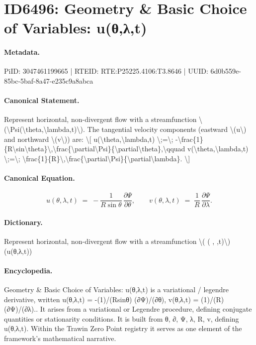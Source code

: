 \section*{ID6496: Geometry \& Basic Choice of Variables: u(θ,λ,t)}
\paragraph{Metadata.}
PiID: 3047461199665 | RTEID: RTE:P25225.4106:T3.8646 | UUID: 6d0b559e-85bc-5baf-8a47-e235c9a8abca

\paragraph{Canonical Statement.}
Represent horizontal, non-divergent flow with a streamfunction \textbackslash{}(\textbackslash{}Psi(\textbackslash{}theta,\textbackslash{}lambda,t)\textbackslash{}). The tangential velocity components (eastward \textbackslash{}(u\textbackslash{}) and northward \textbackslash{}(v\textbackslash{})) are: \textbackslash{}[ u(\textbackslash{}theta,\textbackslash{}lambda,t) \textbackslash{};=\textbackslash{}; -\textbackslash{}frac\{1\}\{R\textbackslash{}sin\textbackslash{}theta\}\textbackslash{},\textbackslash{}frac\{\textbackslash{}partial\textbackslash{}Psi\}\{\textbackslash{}partial\textbackslash{}theta\},\textbackslash{}qquad v(\textbackslash{}theta,\textbackslash{}lambda,t) \textbackslash{};=\textbackslash{}; \textbackslash{}frac\{1\}\{R\}\textbackslash{},\textbackslash{}frac\{\textbackslash{}partial\textbackslash{}Psi\}\{\textbackslash{}partial\textbackslash{}lambda\}. \textbackslash{}]

\paragraph{Canonical Equation.}
\[
u(\theta,\lambda,t) \;=\; -\frac{1}{R\sin\theta}\,\frac{\partial\Psi}{\partial\theta},\qquad v(\theta,\lambda,t) \;=\; \frac{1}{R}\,\frac{\partial\Psi}{\partial\lambda}.
\]

\paragraph{Dictionary.}
Represent horizontal, non-divergent flow with a streamfunction \textbackslash{}( ( , ,t)\textbackslash{}) (u(θ,λ,t))

\paragraph{Encyclopedia.}
Geometry \& Basic Choice of Variables: u(θ,λ,t) is a variational / legendre derivative, written u(θ,λ,t) = -(1)/(Rsinθ) (∂Ψ)/(∂θ), v(θ,λ,t) = (1)/(R) (∂Ψ)/(∂λ).. It arises from a variational or Legendre procedure, defining conjugate quantities or stationarity conditions. It is built from θ, ∂, Ψ, λ, R, v, defining u(θ,λ,t). Within the Trawin Zero Point registry it serves as one element of the framework's mathematical narrative.
